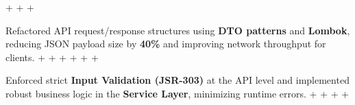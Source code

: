 \documentclass[letterpaper,10pt]{article}                                                                                                                                                                                                                                                                                                                                                                                                                                                                                                                                                                         +
\newcommand{\resumeItem}[1]{                                                                                                                                                                                                                                                                                                                                                                                                                                                                                                                                                                                      +
                                                                                                                                                                                                                                                                                                                                                                                                                                                                                                                                                                                                                   +
   \item\small{#1}\vspace{-3pt}                                                                                                                                                                                                                                                                                                                                                                                                                                                                                                                                                                                    +
                                                                                                                                                                                                                                                                                                                                                                                                                                                                                                                                                                                                                   +
 }                                                                                                                                                                                                                                                                                                                                                                                                                                                                                                                                                                                                                 +
\begin{document}
                                                                                                                                                                                                                                                                                                                                                                                                                                                                                                                                                                                                                   +
     \resumeItem{Refactored API request/response structures using \textbf{DTO patterns} and \textbf{Lombok}, reducing JSON payload size by \textbf{40\%} and improving network throughput for clients.}                                                                                                                                                                                                                                                                                                                                                                                                            +
                                                                                                                                                                                                                                                                                                                                                                                                                                                                                                                                                                                                                   +
     \resumeItem{Enforced strict \textbf{Input Validation (JSR-303)} at the API level and implemented robust business logic in the \textbf{Service Layer}, minimizing runtime errors.}                                                                                                                                                                                                                                                                                                                                                                                                                             +
                                                                                                                                                                                                                                                                                                                                                                                                                                                                                                                                                                                                                   +
\end{document}
